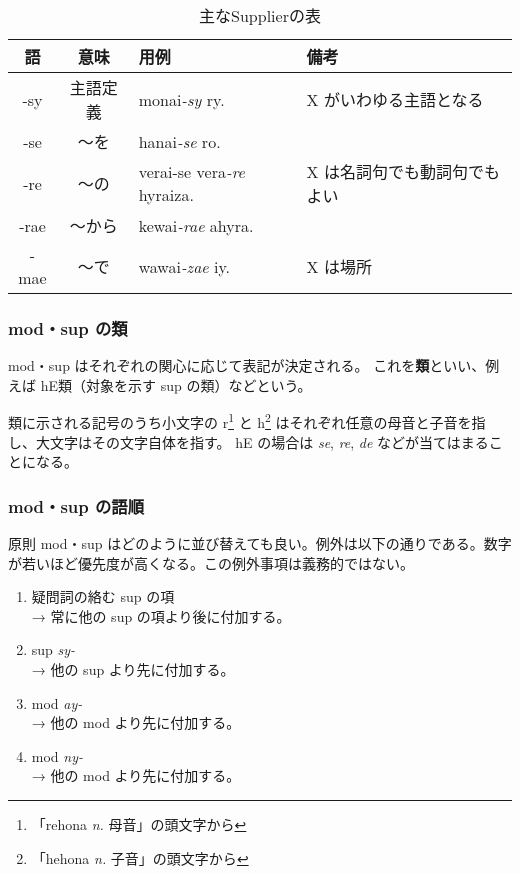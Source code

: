 \begin{table}[h]
    \centering
    \caption{主なSupplierの表}
    \begin{tabular}{ccll}
        \hline
        語 & 意味 & 用例 & 備考 \\
        \hline \hline
        -sy  & 主語定義 & monai\emph{-sy} ry.             & X がいわゆる主語となる \\
        -se  & ～を & hanai\emph{-se} ro.                 & \\
        -re  & ～の & verai-se vera\emph{-re} hyraiza.   & X は名詞句でも動詞句でもよい \\
        -rae & ～から & kewai\emph{-rae} ahyra.            & \\
        -mae & ～で & wawai\emph{-zae} iy.                 & X は場所 \\
        \hline
    \end{tabular}
\end{table}

\subsubsection{mod・sup の類}
mod・sup はそれぞれの関心に応じて表記が決定される。
これを\textbf{類}といい、例えば hE類（対象を示す sup の類）などという。

類に示される記号のうち小文字の r\footnote{「rehona \emph{n.} 母音」の頭文字から} と h\footnote{「hehona \emph{n.} 子音」の頭文字から} はそれぞれ任意の母音と子音を指し、大文字はその文字自体を指す。
hE の場合は \emph{se}, \emph{re}, \emph{de} などが当てはまることになる。

\subsubsection{mod・sup の語順}

原則 mod・sup はどのように並び替えても良い。例外は以下の通りである。数字が若いほど優先度が高くなる。この例外事項は義務的ではない。

\begin{enumerate}
    \item 疑問詞の絡む sup の項 \\ → 常に他の sup の項より後に付加する。
    \item sup \emph{sy-} \\ → 他の sup より先に付加する。
    \item mod \emph{ay-} \\ → 他の mod より先に付加する。
    \item mod \emph{ny-} \\ → 他の mod より先に付加する。
\end{enumerate}

